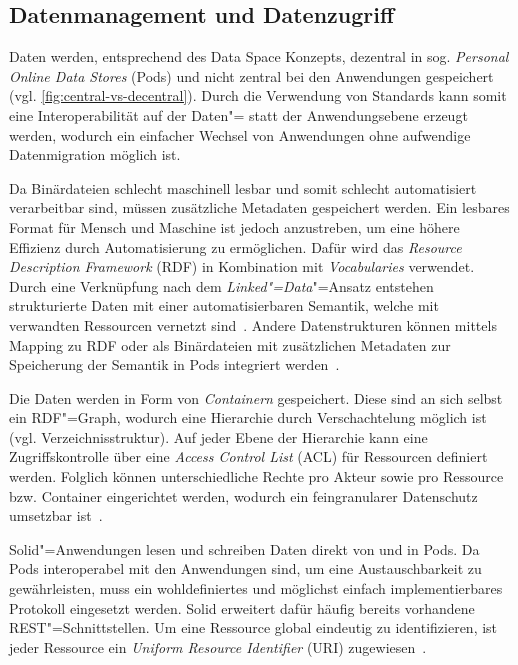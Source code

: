 \subsection{Datenmanagement und Datenzugriff}

Daten werden, entsprechend des Data Space Konzepts, dezentral in sog. \emph{Personal Online Data Stores} (Pods) und nicht zentral bei den Anwendungen gespeichert~\cite{mecklerWebLinkedData2023} (vgl. \autoref{fig:central-vs-decentral}).
Durch die Verwendung von Standards kann somit eine Interoperabilität auf der Daten"= statt der Anwendungsebene erzeugt werden, wodurch ein einfacher Wechsel von Anwendungen ohne aufwendige Datenmigration möglich ist.

Da Binärdateien schlecht maschinell lesbar und somit schlecht automatisiert verarbeitbar sind, müssen zusätzliche Metadaten gespeichert werden.
Ein lesbares Format für Mensch und Maschine ist jedoch anzustreben, um eine höhere Effizienz durch Automatisierung zu ermöglichen.
Dafür wird das \emph{Resource Description Framework} (RDF) in Kombination mit \emph{Vocabularies} verwendet.
Durch eine Verknüpfung nach dem \emph{Linked"=Data}"=Ansatz entstehen strukturierte Daten mit einer automatisierbaren Semantik, welche mit verwandten Ressourcen vernetzt sind~\cite{bizerLinkedDataStory2009,mecklerWebLinkedData2023,sambraSolidPlatformDecentralized2016}.
Andere Datenstrukturen können mittels Mapping zu RDF oder als Binärdateien mit zusätzlichen Metadaten zur Speicherung der Semantik in Pods integriert werden~\cite{mecklerWebLinkedData2023,sambraSolidPlatformDecentralized2016}.

Die Daten werden in Form von \emph{Containern} gespeichert.
Diese sind an sich selbst ein RDF"=Graph, wodurch eine Hierarchie durch Verschachtelung möglich ist (vgl. Verzeichnisstruktur).
Auf jeder Ebene der Hierarchie kann eine Zugriffskontrolle über eine \emph{Access Control List} (ACL) für Ressourcen definiert werden.
Folglich können unterschiedliche Rechte pro Akteur sowie pro Ressource bzw. Container eingerichtet werden, wodurch ein feingranularer Datenschutz umsetzbar ist~\cite{mecklerWebLinkedData2023,sambraSolidPlatformDecentralized2016}.

Solid"=Anwendungen lesen und schreiben Daten direkt von und in Pods.
Da Pods interoperabel mit den Anwendungen sind, um eine Austauschbarkeit zu gewährleisten, muss ein wohldefiniertes und möglichst einfach implementierbares Protokoll eingesetzt werden.
Solid erweitert dafür häufig bereits vorhandene REST"=Schnittstellen.
Um eine Ressource global eindeutig zu identifizieren, ist jeder Ressource ein \emph{Uniform Resource Identifier} (URI) zugewiesen~\cite{mecklerWebLinkedData2023,sambraSolidPlatformDecentralized2016}.

